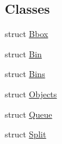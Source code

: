 \subsection*{Classes}
\begin{DoxyCompactItemize}
\item 
struct \hyperlink{structnih_1_1cuda_1_1_sah__builder_1_1_bbox}{Bbox}
\item 
struct \hyperlink{structnih_1_1cuda_1_1_sah__builder_1_1_bin}{Bin}
\item 
struct \hyperlink{structnih_1_1cuda_1_1_sah__builder_1_1_bins}{Bins}
\item 
struct \hyperlink{structnih_1_1cuda_1_1_sah__builder_1_1_objects}{Objects}
\item 
struct \hyperlink{structnih_1_1cuda_1_1_sah__builder_1_1_queue}{Queue}
\item 
struct \hyperlink{structnih_1_1cuda_1_1_sah__builder_1_1_split}{Split}
\end{DoxyCompactItemize}
